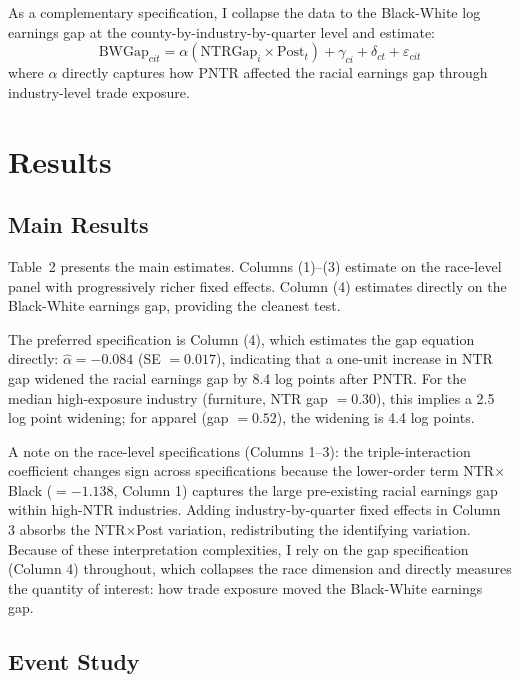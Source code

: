 \documentclass[12pt]{article}
\begin{document}
As a complementary specification, I collapse the data to the Black-White log earnings gap at the county-by-industry-by-quarter level and estimate:
\begin{equation}
\text{BWGap}_{cit} = \alpha (\text{NTRGap}_i \times \text{Post}_t) + \gamma_{ci} + \delta_{ct} + \varepsilon_{cit}
\label{eq:bwgap}
\end{equation}
where $\alpha$ directly captures how PNTR affected the racial earnings gap through industry-level trade exposure.

\section{Results}

\subsection{Main Results}

Table~2 presents the main estimates. Columns (1)--(3) estimate  on the race-level panel with progressively richer fixed effects. Column (4) estimates  directly on the Black-White earnings gap, providing the cleanest test.



The preferred specification is Column (4), which estimates the gap equation directly: $\hat{\alpha} = -0.084$ (SE $= 0.017$), indicating that a one-unit increase in NTR gap widened the racial earnings gap by 8.4 log points after PNTR. For the median high-exposure industry (furniture, NTR gap $= 0.30$), this implies a 2.5 log point widening; for apparel (gap $= 0.52$), the widening is 4.4 log points.

A note on the race-level specifications (Columns 1--3): the triple-interaction coefficient changes sign across specifications because the lower-order term NTR$\times$Black ($= -1.138$, Column 1) captures the large pre-existing racial earnings gap within high-NTR industries. Adding industry-by-quarter fixed effects in Column 3 absorbs the NTR$\times$Post variation, redistributing the identifying variation. Because of these interpretation complexities, I rely on the gap specification (Column 4) throughout, which collapses the race dimension and directly measures the quantity of interest: how trade exposure moved the Black-White earnings gap.

\subsection{Event Study}
\end{document}
